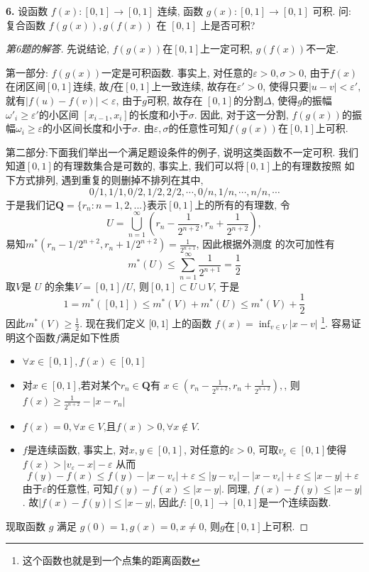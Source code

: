 \documentclass[a4paper,12pt]{article}
\theoremstyle{nonumberplain}
\begin{document}
\noindent \textbf{6.} 设函数 $f(x):[0,1]\to [0,1]$ 连续, 函数 $g(x):[0,1]\to [0,1]$ 可积. 
问: 复合函数 $f(g(x)),g(f(x))$ 在 $[0,1]$ 上是否可积?
\begin{proof}[第6题的解答]
  先说结论, $f(g(x))$在$[0,1]$上一定可积, $g(f(x))$不一定.

  \noindent 第一部分: $f(g(x))$一定是可积函数. 事实上, 对任意的$\varepsilon>0,\sigma>0$, 
  由于$f(x)$在闭区间$[0,1]$连续, 故$f$在$[0,1]$上一致连续, 故存在$\varepsilon'>0$,
  使得只要$|u-v|<\varepsilon',$就有$|f(u)-f(v)|<\varepsilon$, 由于$g$可积, 故存在
  $[0,1]$的分割$\Delta$, 使得$g$的振幅$\omega'_i\geq \varepsilon'$的小区间
  $[x_{i-1},x_i]$的长度和小于$\sigma$. 因此, 对于这一分割, 
  $f(g(x))$的振幅$\omega_i\geq \varepsilon$的小区间长度和小于$\sigma$.
  由$\varepsilon,\sigma$的任意性可知$f(g(x))$在$[0,1]$上可积.

  \noindent 第二部分:下面我们举出一个满足题设条件的例子, 说明这类函数不一定可积.
  我们知道$[0,1]$的有理数集合是可数的, 事实上, 我们可以将$[0,1]$上的有理数按照
  如下方式排列, 遇到重复的则删掉不排列在其中,
  \[0/1,1/1,0/2,1/2,2/2,\cdots,0/n,1/n,\cdots,n/n,\cdots\]
  于是我们记$ \mathbf Q=\{r_n:n=1,2,...\}$表示$[0,1]$上的所有的有理数, 令
  \[U=\bigcup_{n=1}^\infty(r_n-\frac{1}{2^{n+2}},r_n+\frac{1}{2^{n+2}}),\] 
  易知$m^*{(r_n-1/{2^{n+2}},r_n+1/{2^{n+2}})}=\frac{1}{2^{n+1}}$, 因此根据外测度
  的次可加性有
  \[m^*(U)\leq \sum_{n=1}^{\infty}\frac{1}{2^{n+1}}=\frac{1}{2}\]
  取$V $是 $U$ 的余集$V=[0,1]/U$, 则$[0,1]\subset U\cup V$, 于是
  \[1=m^*([0,1])\leq m^*(V)+m^*(U)\leq m^*(V)+\frac{1}{2}\]
  因此$m^*(V)\geq \frac{1}{2}$.
  现在我们定义 $\mathbf [0,1]$ 上的函数 $f(x)=\inf_{v\in V}|x-v|$
  \footnote{这个函数也就是到一个点集的距离函数}.
  容易证明这个函数$f$满足如下性质
  \begin{itemize}
    \item $\forall x\in[0,1],f(x)\in[0,1]$
    \item 对$x\in[0,1]$,若对某个$r_n\in \mathbf Q$有
      $x\in(r_n-\frac{1}{2^{n+2}},r_n+\frac{1}{2^{n+2}}),$, 
      则$f(x)\geq \frac{1}{2^{n+2}}-|x-r_n|$
    \item $f(x)=0,\forall x\in V$,且$f(x)>0,\forall x\notin V$.
    \item $f$是连续函数, 事实上, 对$x,y\in[0,1]$, 对任意的$\varepsilon>0$, 
      可取$v_\varepsilon\in[0,1]$使得$f(x)>|v_\varepsilon-x|-\varepsilon$
      从而
      \[f(y)-f(x)\leq f(y)-|x-v_\varepsilon|+\varepsilon\leq |y-v_\varepsilon|-|x-v_\varepsilon|+\varepsilon\leq|x-y|+\varepsilon\]
      由于$\varepsilon$的任意性, 可知$f(y)-f(x)\leq |x-y|$. 
      同理, $f(x)-f(y)\leq |x-y|$. 故$|f(x)-f(y)|\leq |x-y|$, 
      因此$f:[0,1]\to[0,1]$是一个连续函数.
  \end{itemize}
  现取函数 $g$ 满足 $g(0)=1, g(x)=0, x\neq0$, 则$g$在$[0,1]$上可积. 


\end{proof}
\end{document}
